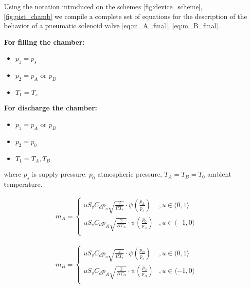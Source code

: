 Using the notation introduced on the schemes \ref{fig:device_scheme},
\ref{fig:pist_chamb} we compile a complete set of equations for the
description of the behavior of a
pneumatic solenoid valve \ref{eq:m_A_final}, \ref{eq:m_B_final}.

\textbf{For filling the chamber:}
\begin{itemize}
\item $p_1 = p_s$ 
\item $p_2 = p_A \text{ or } p_B$
\item $T_1 = T_s$
\end{itemize}

\textbf{For discharge the chamber:}
\begin{itemize}
\item $p_1 = p_A \text{ or } p_B$
\item $p_2 = p_0$
\item $T_1 = T_A, T_B$
\end{itemize}

where $p_s$ is supply pressure. $p_0$ atmospheric pressure, $T_A = T_B =
T_0$ ambient temperature.

\begin{align}
    \dot{m}_A =
    \begin{cases}
        u S_v C_d p_s \sqrt{\frac{2}{RT_s}}
        \cdot \psi\left(\frac{p_A}{p_s}\right)  &,   u \in (0, 1 \rangle \\
        u S_v C_d p_A \sqrt{\frac{2}{RT_A}}
        \cdot \psi\left(\frac{p_0}{p_A}\right)  &,   u \in \langle -1, 0) \\
    \end{cases}
    \label{eq:m_A_final}
\end{align}

\begin{align}
    \dot{m}_B =
    \begin{cases}
        u S_v C_d p_s \sqrt{\frac{2}{RT_s}}
        \cdot \psi\left(\frac{p_B}{p_s}\right)  &,   u \in (0, 1 \rangle \\
        u S_v C_d p_A \sqrt{\frac{2}{RT_B}}
        \cdot \psi\left(\frac{p_0}{p_B}\right)  &,   u \in \langle -1, 0) \\
    \end{cases}
    \label{eq:m_B_final}
\end{align}



